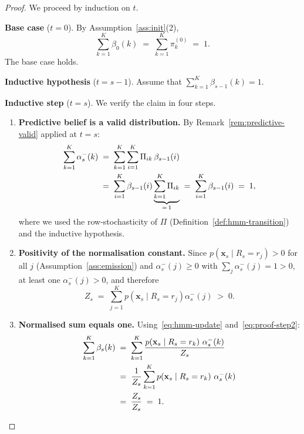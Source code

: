 \documentclass[12pt,openany]{book}
\newcommand{\bfx}{\mathbf{x}}
\numberwithin{equation}{chapter}
\theoremstyle{plain}
\theoremstyle{definition}
\theoremstyle{remark}
\numberwithin{equation}{chapter}
\theoremstyle{plain}
\begin{document}
\begin{proof}
We proceed by induction on $t$.

\medskip
\noindent\textbf{Base case} ($t = 0$).
By Assumption~\ref{ass:init}(2),
\begin{equation}
  \sum_{k=1}^{K} \beta_0(k)
  \;=\;
  \sum_{k=1}^{K} \pi^{(0)}_k
  \;=\; 1.
  \label{eq:hmm-norm-base}
\end{equation}
The base case holds.

\medskip
\noindent\textbf{Inductive hypothesis} ($t = s-1$).
Assume that $\displaystyle\sum_{k=1}^{K} \beta_{s-1}(k) = 1$.

\medskip
\noindent\textbf{Inductive step} ($t = s$).
We verify the claim in four steps.

\begin{enumerate}
  \item \textbf{Predictive belief is a valid distribution.}
        By Remark~\ref{rem:predictive-valid} applied at $t = s$:
        \begin{align}
          \sum_{k=1}^{K} \alpha_s^{-}(k)
          &\;=\; \sum_{k=1}^{K} \sum_{i=1}^{K} \Pi_{ik}\,\beta_{s-1}(i)
          \notag\\
          &\;=\; \sum_{i=1}^{K} \beta_{s-1}(i)
                 \underbrace{\sum_{k=1}^{K} \Pi_{ik}}_{=\,1}
          \;=\; \sum_{i=1}^{K} \beta_{s-1}(i)
          \;=\; 1,
          \label{eq:proof-step1}
        \end{align}
        where we used the row-stochasticity of $\Pi$
        (Definition~\ref{def:hmm-transition}) and the inductive hypothesis.

  \item \textbf{Positivity of the normalisation constant.}
        Since $p(\bfx_s \mid R_s = r_j) > 0$ for all $j$
        (Assumption~\ref{ass:emission}) and $\alpha_s^{-}(j) \geq 0$
        with $\sum_j \alpha_s^{-}(j) = 1 > 0$, at least one
        $\alpha_s^{-}(j) > 0$, and therefore
        \begin{equation}
          Z_s
          \;=\; \sum_{j=1}^{K}
                p\!\left(\bfx_s \mid R_s = r_j\right)\alpha_s^{-}(j)
          \;>\; 0.
          \label{eq:proof-step2}
        \end{equation}

  \item \textbf{Normalised sum equals one.}
        Using~\eqref{eq:hmm-update} and~\eqref{eq:proof-step2}:
        \begin{align}
          \sum_{k=1}^{K} \beta_s(k)
          &\;=\;
          \sum_{k=1}^{K}
          \frac{
            p\!\left(\bfx_s \mid R_s = r_k\right)\,\alpha_s^{-}(k)
          }{Z_s}
          \notag\\
          &\;=\;
          \frac{1}{Z_s}
          \sum_{k=1}^{K}
            p\!\left(\bfx_s \mid R_s = r_k\right)\,\alpha_s^{-}(k)
          \notag\\
          &\;=\;
          \frac{Z_s}{Z_s}
          \;=\; 1.
          \label{eq:proof-step3}
        \end{align}


\end{enumerate}
\end{proof}
\end{document}
